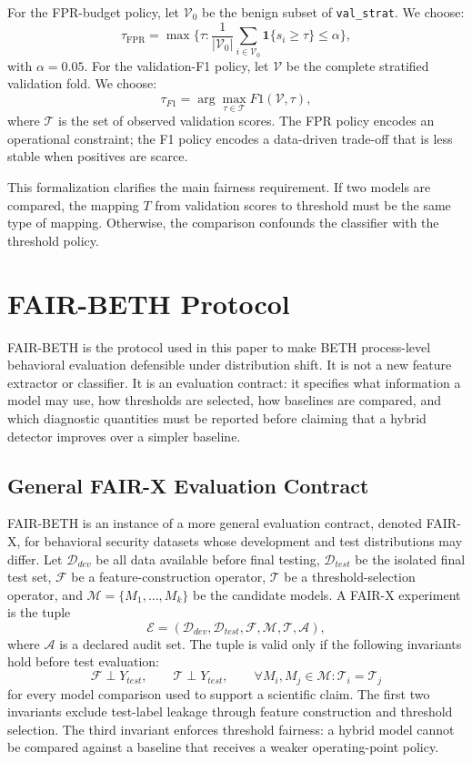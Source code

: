 \documentclass[10pt,journal,compsoc]{IEEEtran}
\begin{document}
For the FPR-budget policy, let $\mathcal{V}_0$ be the benign subset of \texttt{val\_strat}. We choose:
\[
\tau_{\mathrm{FPR}}=\max\{\tau: \frac{1}{|\mathcal{V}_0|}\sum_{i\in \mathcal{V}_0}\mathbf{1}\{s_i\geq\tau\}\leq \alpha\},
\]
with $\alpha=0.05$. For the validation-F1 policy, let $\mathcal{V}$ be the complete stratified validation fold. We choose:
\[
\tau_{F1}=\arg\max_{\tau \in \mathcal{T}} F1(\mathcal{V},\tau),
\]
where $\mathcal{T}$ is the set of observed validation scores. The FPR policy encodes an operational constraint; the F1 policy encodes a data-driven trade-off that is less stable when positives are scarce.

This formalization clarifies the main fairness requirement. If two models are compared, the mapping $T$ from validation scores to threshold must be the same type of mapping. Otherwise, the comparison confounds the classifier with the threshold policy.

\section{FAIR-BETH Protocol}
\label{sec:fairbeth}

FAIR-BETH is the protocol used in this paper to make BETH process-level behavioral evaluation defensible under distribution shift. It is not a new feature extractor or classifier. It is an evaluation contract: it specifies what information a model may use, how thresholds are selected, how baselines are compared, and which diagnostic quantities must be reported before claiming that a hybrid detector improves over a simpler baseline.

\subsection{General FAIR-X Evaluation Contract}
\label{sec:fairx_contract}

FAIR-BETH is an instance of a more general evaluation contract, denoted FAIR-X, for behavioral security datasets whose development and test distributions may differ. Let $\mathcal{D}_{dev}$ be all data available before final testing, $\mathcal{D}_{test}$ be the isolated final test set, $\mathcal{F}$ be a feature-construction operator, $\mathcal{T}$ be a threshold-selection operator, and $\mathcal{M}=\{M_1,\ldots,M_k\}$ be the candidate models. A FAIR-X experiment is the tuple
\[
\mathcal{E}=(\mathcal{D}_{dev},\mathcal{D}_{test},\mathcal{F},\mathcal{M},\mathcal{T},\mathcal{A}),
\]
where $\mathcal{A}$ is a declared audit set. The tuple is valid only if the following invariants hold before test evaluation:
\[
\mathcal{F}\perp Y_{test}, \qquad \mathcal{T}\perp Y_{test}, \qquad
\forall M_i,M_j\in\mathcal{M}: \mathcal{T}_i=\mathcal{T}_j
\]
for every model comparison used to support a scientific claim. The first two invariants exclude test-label leakage through feature construction and threshold selection. The third invariant enforces threshold fairness: a hybrid model cannot be compared against a baseline that receives a weaker operating-point policy.
\end{document}
